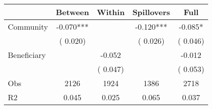 
\begin{tabular}{l*{4}{c}}\hline&\multicolumn{1}{c}{Between}&\multicolumn{1}{c}{Within}&\multicolumn{1}{c}{Spillovers}&\multicolumn{1}{c}{Full}\\ \hline
 Community             &             -0.070***      &                                               &       -0.120*** &        -0.085*                            \\ 
                               &        (       0.020)           &                                       &       (       0.026)     &      (       0.046)                                           \\ 
 Beneficiary   &                                               &       -0.052    &                                &            -0.012                            \\ 
                               &                                               & (       0.047)                  &                                        &      (       0.053)                                           \\ 
\hline                                                                                                                                                                                                                                            
 Obs                   &               2126               &       1924                       &       1386                &              2718                                               \\ 
 R2                    &                      0.045              &              0.025                      &              0.065               &                     0.037                                              \\ 
\hline \end{tabular}                                                                                                                                                                                                              